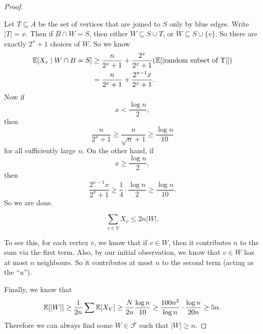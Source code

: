 \documentclass[a4paper]{article}
\begin{document}
\begin{proof}
\begin{center}
  \end{center}
  Let $T \subseteq A$ be the set of vertices that are joined to $S$ only by blue edges. Write $|T| = x$. Then if $B \cap W = S$, then either $W \subseteq S \cup T$, or $W \subseteq S \cup \{v\}$. So there are exactly $2^x + 1$ choices of $W$. So we know
  \begin{align*}
    \mathbb{E}[X_v \mid W \cap B = S] &\geq \frac{n}{2^x + 1} + \frac{2^x}{2^x + 1}(\mathbb{E}[|\text{random subset of T}|])\\
                              &= \frac{n}{2^x + 1} + \frac{2^{x - 1}x}{2^x + 1}.
  \end{align*}
  Now if
  \[
    x < \frac{\log n}{2},
  \]
  then
  \[
    \frac{n}{2^x + 1} \geq \frac{n}{\sqrt{n} + 1} \geq \frac{\log n}{10}
  \]
  for all sufficiently large $n$. On the other hand, if
  \[
    x \geq \frac{\log n}{2},
  \]
  then
  \[
    \frac{2^{x - 1}x}{2^x + 1} \geq \frac{1}{4} \cdot \frac{\log n}{2} \geq \frac{\log n}{10}.
  \]
  So we are done.

  \begin{claim}
    \[
      \sum_{v \in V} X_v \leq 2n |W|.
    \]
  \end{claim}
  To see this, for each vertex $v$, we know that if $v \in W$, then it contributes $n$ to the sum via the first term. Also, by our initial observation, we know that $v \in W$ has at most $n$ neighbours. So it contributes at most $n$ to the second term (acting as the ``$u$'').

  Finally, we know that
  \[
    \mathbb{E}[|W|] \geq \frac{1}{2n} \sum \mathbb{E}[X_V] \geq \frac{N}{2n} \frac{\log n}{10} \geq \frac{100n^2}{\log n} \cdot \frac{\log n}{20 n} \geq 5n.
  \]
  Therefore we can always find some $W \in \mathcal{F}$ such that $|W| \geq n$.
\end{proof}
\end{document}
